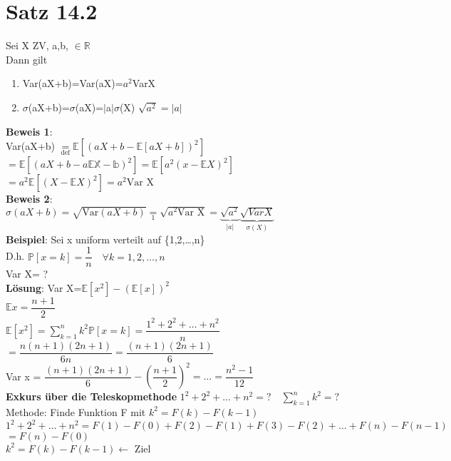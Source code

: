 \section{Satz 14.2}Sei X ZV, a,b, $\in \mathds{R}$\\Dann gilt
\begin{enumerate}
	\item Var(aX+b)=Var(aX)=$a^2$VarX
	\item $\sigma$(aX+b)=$\sigma$(aX)=$\vert$a$\vert\sigma$(X) \hspace{1cm} $\sqrt{a^2}=\vert a\vert$
\end{enumerate}
\textbf{Beweis 1}:\\
Var(aX+b) $\underset{\text{def}}{=}\mathds{E}\left[\left(aX+b-\mathds{E}[aX+b]\right)^2\right]$\smallskip\\
$=\mathds{E}\left[\left(aX+b-a\mathds{EX-b}\right)^2\right]=\mathds{E}[a^2(x-\mathds{E}X)^2]$\smallskip\\
$=a^2\mathds{E}[(X-\mathds{E}X)^2]=a^2 \text{Var X}$\medskip\\
\textbf{Beweis 2}:\\
$\sigma(aX+b) = \sqrt{\text{Var}(aX+b)} \underset{1}{=}\sqrt{a^2\text{Var X}}= \underbrace{\sqrt{a^2}}_{|a|}\underbrace{\sqrt{Var X}}_{\sigma(X)}$\medskip\\
\textbf{Beispiel}: Sei x uniform verteilt auf \{1,2,\dots,n\}\\
D.h. $\mathds{P}[x=k] = \dfrac{1}{n}\quad \forall k=1,2,\dots,n$\\Var X= ?\medskip\\
\textbf{Lösung}: Var X=$\mathds{E}[x^2]-(\mathds{E}[x])^2$\smallskip\\
$\mathds{E}x=\dfrac{n+1}{2}$\medskip\\
$\mathds{E}[x^2] = \sum_{k=1}^nk^2\mathds{P}[x=k]= \dfrac{1^2+2^2+\dots+n^2}{n}$\smallskip\\
$=\dfrac{n(n+1)(2n+1)}{6n}=\dfrac{(n+1)(2n+1)}{6}$\smallskip\\
Var x = $\dfrac{(n+1)(2n+1)}{6}- (\dfrac{n+1}{2})^2 = \dots = \dfrac{n^2-1}{12}$\medskip\\
\textbf{Exkurs über die Teleskopmethode}
$1^2+2^2+\dots+n^2 = ? \quad \sum_{k=1}^nk^2 = ?$\smallskip\\
Methode: Finde Funktion F mit $k^2 = F(k)-F(k-1)$\\
$1^2+2^2+\dots+n^2=F(1)-F(0)+F(2)-F(1)+F(3)-F(2)+\dots+F(n)-F(n-1)$\smallskip\\
$=F(n)-F(0)$\medskip\\
$k^2 = F(k)-F(k-1) \leftarrow \text{ Ziel}$\smallskip\\
